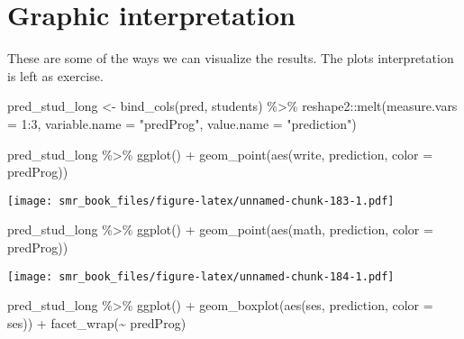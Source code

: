 \documentclass[
  oneside]{book}
\newenvironment{Shaded}{\begin{snugshade}}{\end{snugshade}}
\newcommand{\AttributeTok}[1]{\textcolor[rgb]{0.77,0.63,0.00}{#1}}
\newcommand{\DecValTok}[1]{\textcolor[rgb]{0.00,0.00,0.81}{#1}}
\newcommand{\FunctionTok}[1]{\textcolor[rgb]{0.00,0.00,0.00}{#1}}
\newcommand{\NormalTok}[1]{#1}
\newcommand{\OtherTok}[1]{\textcolor[rgb]{0.56,0.35,0.01}{#1}}
\newcommand{\SpecialCharTok}[1]{\textcolor[rgb]{0.00,0.00,0.00}{#1}}
\newcommand{\StringTok}[1]{\textcolor[rgb]{0.31,0.60,0.02}{#1}}
\begin{document}
\hypertarget{graphic-interpretation}{%
\section{Graphic interpretation}\label{graphic-interpretation}}

These are some of the ways we can visualize the results.
The plots interpretation is left as exercise.

\begin{Shaded}
\begin{Highlighting}[]
\NormalTok{pred\_stud\_long }\OtherTok{\textless{}{-}} \FunctionTok{bind\_cols}\NormalTok{(pred, students) }\SpecialCharTok{\%\textgreater{}\%}
\NormalTok{  reshape2}\SpecialCharTok{::}\FunctionTok{melt}\NormalTok{(}\AttributeTok{measure.vars =} \DecValTok{1}\SpecialCharTok{:}\DecValTok{3}\NormalTok{,}
       \AttributeTok{variable.name =} \StringTok{"predProg"}\NormalTok{,}
       \AttributeTok{value.name =} \StringTok{"prediction"}\NormalTok{)}

\NormalTok{pred\_stud\_long }\SpecialCharTok{\%\textgreater{}\%}
  \FunctionTok{ggplot}\NormalTok{() }\SpecialCharTok{+}
  \FunctionTok{geom\_point}\NormalTok{(}\FunctionTok{aes}\NormalTok{(write, prediction, }\AttributeTok{color =}\NormalTok{ predProg))}
\end{Highlighting}
\end{Shaded}

\texttt{[image: smr\_book\_files/figure-latex/unnamed-chunk-183-1.pdf]}

\begin{Shaded}
\begin{Highlighting}[]
\NormalTok{pred\_stud\_long }\SpecialCharTok{\%\textgreater{}\%}
  \FunctionTok{ggplot}\NormalTok{() }\SpecialCharTok{+}
  \FunctionTok{geom\_point}\NormalTok{(}\FunctionTok{aes}\NormalTok{(math, prediction, }\AttributeTok{color =}\NormalTok{ predProg))}
\end{Highlighting}
\end{Shaded}

\texttt{[image: smr\_book\_files/figure-latex/unnamed-chunk-184-1.pdf]}

\begin{Shaded}
\begin{Highlighting}[]
\NormalTok{pred\_stud\_long }\SpecialCharTok{\%\textgreater{}\%}
  \FunctionTok{ggplot}\NormalTok{() }\SpecialCharTok{+}
  \FunctionTok{geom\_boxplot}\NormalTok{(}\FunctionTok{aes}\NormalTok{(ses, prediction, }\AttributeTok{color =}\NormalTok{ ses)) }\SpecialCharTok{+}
  \FunctionTok{facet\_wrap}\NormalTok{(}\SpecialCharTok{\textasciitilde{}}\NormalTok{ predProg)}
\end{Highlighting}
\end{Shaded}
\end{document}
